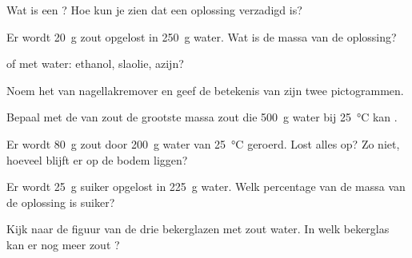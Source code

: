 \begin{exercise}[$\star$]\label{exo:g6:solutions-and-solubility:2}
Wat is een ? Hoe kun je zien dat een oplossing
verzadigd is?
\end{exercise}

\begin{exercise}[$\star$]\label{exo:g6:solutions-and-solubility:3}
Er wordt \qty{20}{g} zout opgelost in \qty{250}{g} water. Wat is de
massa van de oplossing?
\end{exercise}

\begin{exercise}[$\star$]\label{exo:g6:solutions-and-solubility:4}
 of  met water: ethanol, slaolie, azijn?
\end{exercise}

\begin{exercise}[$\star$]\label{exo:g6:solutions-and-solubility:5}
Noem het  van nagellakremover en geef de betekenis van zijn
twee pictogrammen.
\end{exercise}

\begin{exercise}[$\star\star$]\label{exo:g6:solutions-and-solubility:6}
Bepaal met de  van zout de grootste massa zout die
\qty{500}{g} water bij \qty{25}{\celsius} kan .
\end{exercise}

\begin{exercise}[$\star\star$]\label{exo:g6:solutions-and-solubility:7}
Er wordt \qty{80}{g} zout door \qty{200}{g} water van
\qty{25}{\celsius} geroerd. Lost alles op? Zo niet, hoeveel blijft er op
de bodem liggen?
\end{exercise}

\begin{exercise}[$\star\star$]\label{exo:g6:solutions-and-solubility:8}
Er wordt \qty{25}{g} suiker opgelost in \qty{225}{g} water. Welk
percentage van de massa van de oplossing is suiker?
\end{exercise}

\begin{exercise}[$\star\star$]\label{exo:g6:solutions-and-solubility:9}
Kijk naar de figuur van de drie bekerglazen met zout water. In welk
bekerglas kan er nog meer zout ?
\end{exercise}

